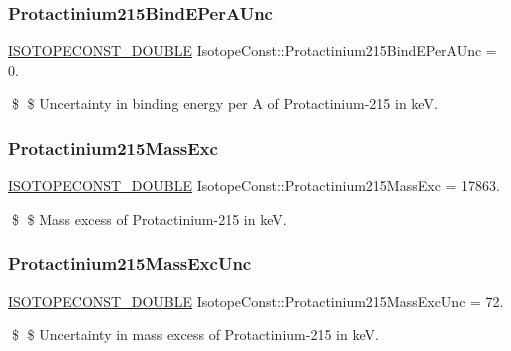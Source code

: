 \subsubsection{\texorpdfstring{Protactinium215\+Bind\+E\+Per\+A\+Unc}{Protactinium215BindEPerAUnc}}
{\footnotesize\ttfamily \mbox{\hyperlink{group___isotope_const-_macros_ga8f45a7272ce02c0b4c65c44636ed719a}{I\+S\+O\+T\+O\+P\+E\+C\+O\+N\+S\+T\+\_\+\+D\+O\+U\+B\+LE}} Isotope\+Const\+::\+Protactinium215\+Bind\+E\+Per\+A\+Unc = 0.}

\$ \$ Uncertainty in binding energy per A of Protactinium-\/215 in keV. \mbox{\label{group___isotope_const-_protactinium-_pa215_gaf21ef663add22c9dd00a44212d03923d}} 
\subsubsection{\texorpdfstring{Protactinium215\+Mass\+Exc}{Protactinium215MassExc}}
{\footnotesize\ttfamily \mbox{\hyperlink{group___isotope_const-_macros_ga8f45a7272ce02c0b4c65c44636ed719a}{I\+S\+O\+T\+O\+P\+E\+C\+O\+N\+S\+T\+\_\+\+D\+O\+U\+B\+LE}} Isotope\+Const\+::\+Protactinium215\+Mass\+Exc = 17863.}

\$ \$ Mass excess of Protactinium-\/215 in keV. \mbox{\label{group___isotope_const-_protactinium-_pa215_gafc510cc6cb1872fe1ebd06f8f9adff60}} 
\subsubsection{\texorpdfstring{Protactinium215\+Mass\+Exc\+Unc}{Protactinium215MassExcUnc}}
{\footnotesize\ttfamily \mbox{\hyperlink{group___isotope_const-_macros_ga8f45a7272ce02c0b4c65c44636ed719a}{I\+S\+O\+T\+O\+P\+E\+C\+O\+N\+S\+T\+\_\+\+D\+O\+U\+B\+LE}} Isotope\+Const\+::\+Protactinium215\+Mass\+Exc\+Unc = 72.}

\$ \$ Uncertainty in mass excess of Protactinium-\/215 in keV. \mbox{\label{group___isotope_const-_protactinium-_pa215_ga0b0e98ce8e8d0fbf95ad007c3270bd8f}} 
